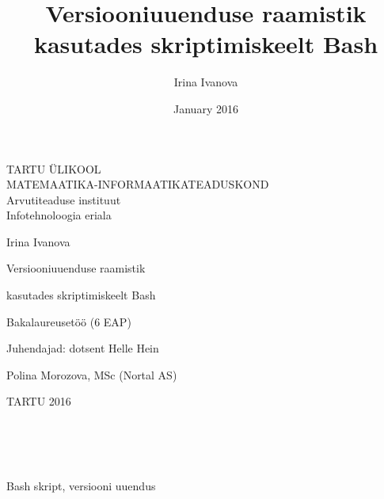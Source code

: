 \documentclass[12pt]{report}
\title{Versiooniuuenduse raamistik kasutades skriptimiskeelt Bash}
\author{Irina Ivanova}
\date{January 2016}
\begin{document}
  \begin{titlepage}
    \begin{center}
      TARTU ÜLIKOOL\\
      MATEMAATIKA-INFORMAATIKATEADUSKOND\\
      Arvutiteaduse instituut\\
      Infotehnoloogia eriala
    \end{center}
      
    \vspace{5cm}
    
    \begin{center}  
      {\Large Irina Ivanova}
    \end{center}
    \begin{center}      
      {\huge Versiooniuuenduse raamistik}
    \end{center}
    \begin{center}
      {\huge kasutades skriptimiskeelt Bash}
    \end{center}
    \begin{center}
      {\large Bakalaureusetöö (6 EAP)}
    \end{center}
      
    \vspace{4cm}
    \hspace{4.5cm}
    Juhendajad: dotsent Helle Hein
    
    \hspace{7cm}
    Polina Morozova, MSc (Nortal AS)
      
    \vspace{2.5cm}
    \begin{center}
      TARTU 2016
    \end{center}
  \end{titlepage}

  \newpage
  
  \\
  
  \\
  \vspace{2cm}
  
  \\
  Bash skript, versiooni uuendus
  \vspace{2cm}

  \\

  \\
  \vspace{2cm}
\end{document}
